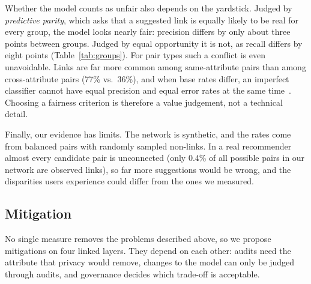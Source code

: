\documentclass[runningheads]{llncs}
\begin{document}
Whether the model counts as unfair also depends on the yardstick. Judged by \emph{predictive parity}, which asks that a suggested link is equally likely to be real for every group, the model looks nearly fair: precision differs by only about three points between groups. Judged by equal opportunity it is not, as recall differs by eight points (Table~\ref{tab:groups}). For pair types such a conflict is even unavoidable. Links are far more common among same-attribute pairs than among cross-attribute pairs (77\% vs.\ 36\%), and when base rates differ, an imperfect classifier cannot have equal precision and equal error rates at the same time~\cite{kleinberg2017,chouldechova2017}. Choosing a fairness criterion is therefore a value judgement, not a technical detail.

Finally, our evidence has limits. The network is synthetic, and the rates come from balanced pairs with randomly sampled non-links. In a real recommender almost every candidate pair is unconnected (only 0.4\% of all possible pairs in our network are observed links), so far more suggestions would be wrong, and the disparities users experience could differ from the ones we measured.

\subsection{Mitigation}
\label{Ethics Mitigation}

No single measure removes the problems described above, so we propose mitigations on four linked layers. They depend on each other: audits need the attribute that privacy would remove, changes to the model can only be judged through audits, and governance decides which trade-off is acceptable.
\end{document}
